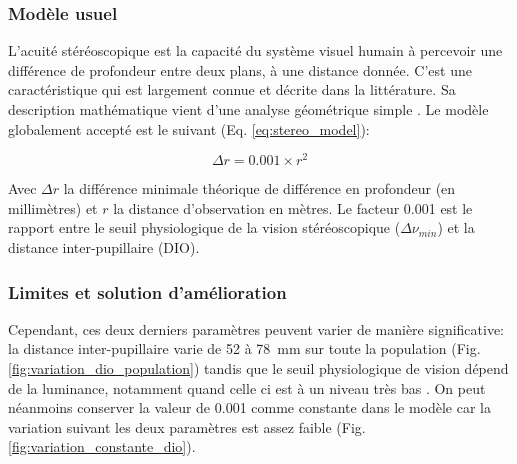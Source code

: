 	\subsubsection{Modèle usuel}	
	\par L'acuité stéréoscopique est la capacité du système visuel humain à percevoir une différence de profondeur entre deux plans, à une distance donnée. C'est une caractéristique qui est largement connue et décrite dans la littérature. Sa description mathématique vient d'une analyse géométrique simple \citep{fuchs_traite_2003,gross_human_2008}. Le modèle globalement accepté est le suivant (Eq. \ref{eq:stereo_model}):

	\begin{equation}	
		\Delta r = 0.001 \times r^2
		\label{eq:stereo_model}
	\end{equation}
	 
	\par Avec $\Delta r$ la différence minimale théorique de différence en profondeur (en millimètres) et $r$ la distance d'observation en mètres. Le facteur 0.001 est le rapport entre le seuil physiologique de la vision stéréoscopique ($\Delta \nu_{min}$) et la distance inter-pupillaire (DIO).
	
	\subsubsection{Limites et solution d'amélioration}
	\par Cependant, ces deux derniers paramètres peuvent varier de manière significative: la distance inter-pupillaire varie de 52 à 78~mm sur toute la population \citep{dodgson_variation_2004} (Fig. \ref{fig:variation_dio_population}) tandis que le seuil physiologique de vision dépend de la luminance, notamment quand celle ci est à un niveau très bas \citep{gross_human_2008}. On peut néanmoins conserver la valeur de 0.001 comme constante dans le modèle car la variation suivant les deux paramètres est assez faible (Fig. \ref{fig:variation_constante_dio}).
	
